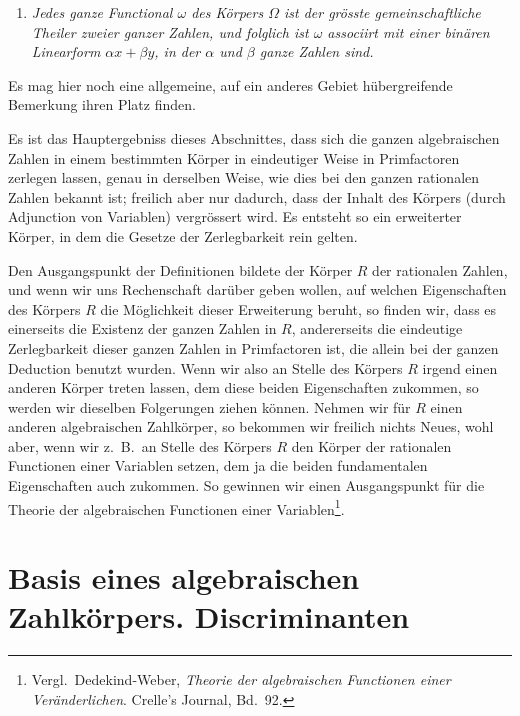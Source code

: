 \documentclass[12pt,a4paper]{article}
\theoremstyle{definition}
\begin{document}
\begin{enumerate}[label=\arabic*., resume]
\item \textit{Jedes ganze Functional $\omega$ des Körpers $\Omega$ ist der grösste gemeinschaftliche Theiler zweier ganzer Zahlen, und folglich ist $\omega$ associirt mit einer binären Linearform $\alpha x + \beta y$, in der $\alpha$ und $\beta$ ganze Zahlen sind.}
\end{enumerate}

Es mag hier noch eine allgemeine, auf ein anderes Gebiet hübergreifende Bemerkung ihren Platz finden.

Es ist das Hauptergebniss dieses Abschnittes, dass sich die ganzen algebraischen Zahlen in einem bestimmten Körper in eindeutiger Weise in Primfactoren zerlegen lassen, genau in derselben Weise, wie dies bei den ganzen rationalen Zahlen bekannt ist; freilich aber nur dadurch, dass der Inhalt des Körpers (durch Adjunction von Variablen) vergrössert wird. Es entsteht so ein erweiterter Körper, in dem die Gesetze der Zerlegbarkeit rein gelten.

Den Ausgangspunkt der Definitionen bildete der Körper $R$ der rationalen Zahlen, und wenn wir uns Rechenschaft darüber geben wollen, auf welchen Eigenschaften des Körpers $R$ die Möglichkeit dieser Erweiterung beruht, so finden wir, dass es einerseits die Existenz der ganzen Zahlen in $R$, andererseits die eindeutige Zerlegbarkeit dieser ganzen Zahlen in Primfactoren ist, die allein bei der ganzen Deduction benutzt wurden. Wenn wir also an Stelle des Körpers $R$ irgend einen anderen Körper treten lassen, dem diese beiden Eigenschaften zukommen, so werden wir dieselben Folgerungen ziehen können. Nehmen wir für $R$ einen anderen algebraischen Zahlkörper, so bekommen wir freilich nichts Neues, wohl aber, wenn wir z.~B.\ an Stelle des Körpers $R$ den Körper der rationalen Functionen einer Variablen setzen, dem ja die beiden fundamentalen Eigenschaften auch zukommen. So gewinnen wir einen Ausgangspunkt für die Theorie der algebraischen Functionen einer Variablen\footnote{Vergl.\ Dedekind-Weber, \textit{Theorie der algebraischen Functionen einer Veränderlichen}. Crelle's Journal, Bd.~92.}.

\newpage
\section[Basis eines algebraischen Zahlkörpers. Discriminanten]%
        {Basis eines algebraischen Zahlkörpers. Discriminanten}\label{sec:144}
\end{document}
